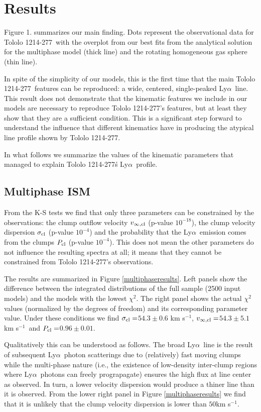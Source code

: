 \documentclass[a4,useAMS,usenatbib,usegraphicx]{mn2e}
\newcommand{\tol}{Tololo 1214-277}
\newcommand{\lya}{Ly$\alpha$}
\newcommand{\kms}{km s$^{-1}$}
\newcommand{\sigmaclump}{$54.3\pm 0.6$ km s$^{-1}$}
\newcommand{\inftyclump}{$54.3\pm 5.1$ km s$^{-1}$}
\newcommand{\probaclump}{$0.96\pm 0.01$}
\begin{document}
\section{Results}


Figure 1. summarizes our main finding.
Dots represent the observational data for \tol\ with the
overplot from our best fits from the analytical solution for the
multiphase model (thick line)  and the rotating homogeneous gas sphere
(thin line). 

In spite of the simplicity of our models, this is the first time that
the main \tol\ features can be reproduced: a wide, centered,
single-peaked \lya\ line.
This result does not demonstrate that the kinematic features we
include in our models are necessary to reproduce \tol's features, but
at least they show that they are a sufficient condition.
This is a significant step forward to understand the influence that
different kinematics have in producing the atypical line profile shown
by \tol.

In what follows we summarize the values of the kinematic parameters
that managed to explain \tol\'s \lya\ profile.


\subsection{Multiphase ISM}

From the K-S tests we find that only three parameters can be
constrained by the observations: the clump outflow velocity
$v_{\infty,\rm{cl}}$ (p-value  $10^{-18}$), the clump velocity
dispersion $\sigma_{\rm cl}$ (p-value $10^{-4}$) and the probability
that the \lya\ emission comes from the clumps $P_{\rm cl}$ (p-value
$10^{-4}$).
This does not mean the other parameters do not influence the resulting
spectra at all; it means that they cannot be constrained from \tol's
observations.


The results are summarized in Figure \ref{multiphaseresults}.
Left panels show the difference between the integrated distributions
of the full sample (2500 input models) and the models with the lowest
$\chi^2$. 
The right panel shows the actual $\chi^2$ values (normalized by the
degrees of freedom) and its corresponding parameter value. 
Under these conditions we find $\sigma_{\rm cl}=$\sigmaclump,
$v_{\infty {\rm, cl}}=$\inftyclump\ and $P_{\rm cl}=$\probaclump. 

Qualitatively this can be understood as follows. The broad \lya\ line
is the result of subsequent \lya\ photon scatterings due to
(relatively) fast moving clumps while the multi-phase nature (i.e., the existence of low-density
inter-clump regions where \lya\ photons can freely prograpagate)
ensures the high flux at line center as observed.  
In turn, a lower velocity dispersion would produce a thiner line than
it is observed.
From the lower right panel in Figure \ref{multiphaseresults} we find that it
is unlikely that the clump velocity dispersion is lower than
$50$\kms. 
\end{document}

